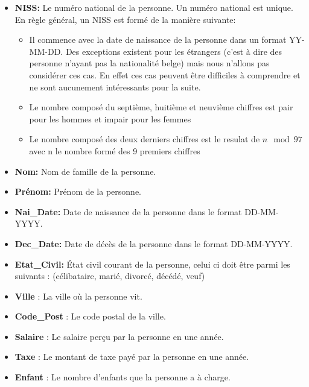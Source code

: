 \documentclass[letterpaper, 12pt]{report}
\theoremstyle{definition}
\begin{document}
\begin{itemize}
\item \textbf{NISS:} Le numéro national de la personne. Un numéro national est unique. En règle général, un NISS est formé de la manière suivante: \cite{bcss}
	\begin{itemize}
	\item Il commence avec la date de naissance de la personne dans un format YY-MM-DD. Des exceptions existent pour les étrangers (c'est à dire des personne n'ayant pas la nationalité belge) mais nous n'allons pas considérer ces cas. En effet ces cas peuvent être difficiles à comprendre et ne sont aucunement intéressants pour la suite.
	\item Le nombre composé du septième, huitième et neuvième chiffres est pair pour les hommes et impair pour les femmes
	\item Le nombre composé des deux derniers chiffres est le resulat de $n \mod 97$ avec n le nombre formé des 9 premiers chiffres
	\end{itemize}
\item \textbf{Nom:} Nom de famille de la personne.
\item \textbf{Prénom:} Prénom de la personne.
\item \textbf{Nai\_Date:} Date de naissance de la personne dans le format DD-MM-YYYY.
\item \textbf{Dec\_Date:} Date de décès de la personne dans le format DD-MM-YYYY.
\item \textbf{Etat\_Civil:} État civil courant de la personne, celui ci doit être parmi les suivants : (célibataire, marié, divorcé, décédé, veuf)
\item \textbf{Ville} : La ville où la personne vit.
\item \textbf{Code\_Post} : Le code postal de la ville.
\item \textbf{Salaire} : Le salaire perçu par la personne en une année.
\item \textbf{Taxe} : Le montant de taxe payé par la personne en une année.
\item \textbf{Enfant} : Le nombre d'enfants que la personne a à charge.
\end{itemize}
\end{document}
